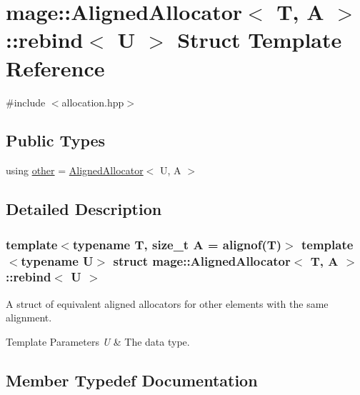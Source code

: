 \hypertarget{structmage_1_1_aligned_allocator_1_1rebind}{}\section{mage\+:\+:Aligned\+Allocator$<$ T, A $>$\+:\+:rebind$<$ U $>$ Struct Template Reference}
\label{structmage_1_1_aligned_allocator_1_1rebind}


{\ttfamily \#include $<$allocation.\+hpp$>$}

\subsection*{Public Types}
\begin{DoxyCompactItemize}
\item 
using \mbox{\hyperlink{structmage_1_1_aligned_allocator_1_1rebind_a12f5ac277f4ef4993d1f73eba91c3439}{other}} = \mbox{\hyperlink{classmage_1_1_aligned_allocator}{Aligned\+Allocator}}$<$ U, A $>$
\end{DoxyCompactItemize}


\subsection{Detailed Description}
\subsubsection*{template$<$typename T, size\+\_\+t A = alignof(\+T)$>$\newline
template$<$typename U$>$\newline
struct mage\+::\+Aligned\+Allocator$<$ T, A $>$\+::rebind$<$ U $>$}

A struct of equivalent aligned allocators for other elements with the same alignment.


\begin{DoxyTemplParams}{Template Parameters}
{\em U} & The data type. \\
\hline
\end{DoxyTemplParams}


\subsection{Member Typedef Documentation}
\mbox{\label{structmage_1_1_aligned_allocator_1_1rebind_a12f5ac277f4ef4993d1f73eba91c3439}} 
